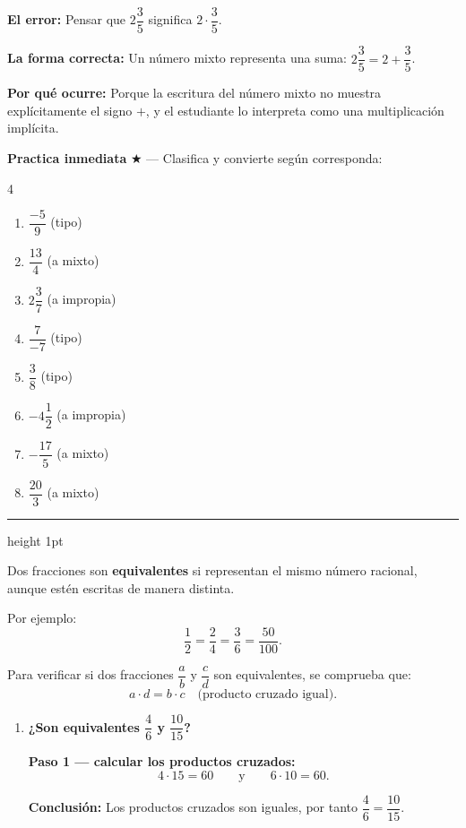 \documentclass[11pt, letterpaper]{article}
\newcommand{\subbloque}[1]{%
  \vspace{14pt}
  \noindent{\large\bfseries\color{zenitnavy} #1}\par
  \vspace{4pt}\hrule height 1pt\vspace{8pt}}
\begin{document}
\begin{tcolorbox}[warningbox, title={Error frecuente --- Interpretar mal el n\'umero mixto}]
\noindent\textbf{El error:}
Pensar que $2\dfrac{3}{5}$ significa $2\cdot\dfrac{3}{5}$.

\medskip
\noindent\textbf{La forma correcta:}
Un n\'umero mixto representa una suma: $2\dfrac{3}{5}=2+\dfrac{3}{5}$.

\medskip
\noindent\textbf{Por qu\'e ocurre:}
Porque la escritura del n\'umero mixto no muestra expl\'icitamente el signo $+$, y el estudiante lo interpreta como una multiplicaci\'on impl\'icita.
\end{tcolorbox}

\medskip
\textbf{Practica inmediata} \quad $\bigstar$ --- Clasifica y convierte seg\'un corresponda:
\begin{multicols}{4}
\begin{enumerate}[label=\alph*), leftmargin=*]
  \item $\dfrac{-5}{9}$ (tipo) \item $\dfrac{13}{4}$ (a mixto)
  \item $2\dfrac{3}{7}$ (a impropia) \item $\dfrac{7}{-7}$ (tipo)
  \item $\dfrac{3}{8}$ (tipo) \item $-4\dfrac{1}{2}$ (a impropia)
  \item $-\dfrac{17}{5}$ (a mixto) \item $\dfrac{20}{3}$ (a mixto)
\end{enumerate}
\end{multicols}

\subbloque{2.2 Fracciones equivalentes}
\label{sub:2.2}

\begin{tcolorbox}[importantbox, title={Definici\'on de fracciones equivalentes}]
Dos fracciones son \textbf{equivalentes} si representan el mismo n\'umero racional, aunque est\'en escritas de manera distinta.

Por ejemplo:
$$\frac{1}{2}=\frac{2}{4}=\frac{3}{6}=\frac{50}{100}.$$

Para verificar si dos fracciones $\dfrac{a}{b}$ y $\dfrac{c}{d}$ son equivalentes, se comprueba que:
$$a\cdot d = b\cdot c \quad \text{(producto cruzado igual).}$$
\end{tcolorbox}

\begin{tcolorbox}[examplebox, title={Ejemplo --- Verificar equivalencia}]
\begin{enumerate}[label=\textbf{Ej. \arabic*.}, leftmargin=*, itemsep=14pt]

\item \textbf{¿Son equivalentes $\dfrac{4}{6}$ y $\dfrac{10}{15}$?}

\textbf{Paso 1 --- calcular los productos cruzados:}
$$4\cdot 15=60 \qquad \text{y} \qquad 6\cdot 10=60.$$

\medskip
\textbf{Conclusi\'on:}
Los productos cruzados son iguales, por tanto $\dfrac{4}{6}=\dfrac{10}{15}$.

\end{enumerate}
\end{tcolorbox}
\end{document}
